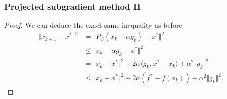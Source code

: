 \documentclass{beamer}
\begin{document}
\begin{frame}
  \frametitle{Projected subgradient method II}
  \begin{proof}
    We can deduce the exact same inequality as before
    \begin{equation}
      \begin{aligned}
        \Vert x_{k+1} - x^* \Vert^2 &= \Vert P_C(x_k - \alpha g_k) - x^* \Vert^2 \\
        &\le \Vert x_k - \alpha g_k - x^* \Vert^2 \\
        &= \Vert x_k-x^* \Vert^2 + 2 \alpha \langle g_k, x^*-x_k \rangle + \alpha^2 \Vert g_k \Vert^2\\
        &\le \Vert x_k-x^* \Vert^2 + 2 \alpha (f^* - f(x_k))+ \alpha^2 \Vert g_k \Vert^2.
      \end{aligned}
    \end{equation}
  \end{proof}

\end{frame}
\end{document}
